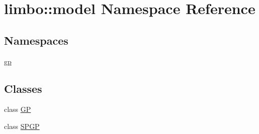 \hypertarget{namespacelimbo_1_1model}{}\section{limbo\+:\+:model Namespace Reference}
\label{namespacelimbo_1_1model}
\subsection*{Namespaces}
\begin{DoxyCompactItemize}
\item 
 \hyperlink{namespacelimbo_1_1model_1_1gp}{gp}
\end{DoxyCompactItemize}
\subsection*{Classes}
\begin{DoxyCompactItemize}
\item 
class \hyperlink{classlimbo_1_1model_1_1_g_p}{GP}
\item 
class \hyperlink{classlimbo_1_1model_1_1_s_p_g_p}{S\+P\+GP}
\end{DoxyCompactItemize}
